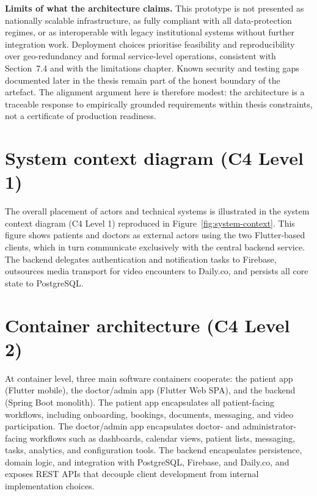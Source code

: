 \documentclass[11pt,a4paper,twoside,openany,headings=normal]{scrreprt}
\begin{document}
\textbf{Limits of what the architecture claims.} This prototype is not presented as nationally scalable infrastructure, as fully compliant with all data-protection regimes, or as interoperable with legacy institutional systems without further integration work. Deployment choices prioritise feasibility and reproducibility over geo-redundancy and formal service-level operations, consistent with Section~7.4 and with the limitations chapter. Known security and testing gaps documented later in the thesis remain part of the honest boundary of the artefact. The alignment argument here is therefore modest: the architecture is a traceable response to empirically grounded requirements within thesis constraints, not a certificate of production readiness.

\section{System context diagram (C4 Level 1)}

The overall placement of actors and technical systems is illustrated in the system context diagram (C4 Level 1) reproduced in Figure~\ref{fig:system-context}. This figure shows patients and doctors as external actors using the two Flutter-based clients, which in turn communicate exclusively with the central backend service. The backend delegates authentication and notification tasks to Firebase, outsources media transport for video encounters to Daily.co, and persists all core state to PostgreSQL.

\ShifaFigSystemContext

\section{Container architecture (C4 Level 2)}

At container level, three main software containers cooperate: the patient app (Flutter mobile), the doctor/admin app (Flutter Web SPA), and the backend (Spring Boot monolith). The patient app encapsulates all patient-facing workflows, including onboarding, bookings, documents, messaging, and video participation. The doctor/admin app encapsulates doctor- and administrator-facing workflows such as dashboards, calendar views, patient lists, messaging, tasks, analytics, and configuration tools. The backend encapsulates persistence, domain logic, and integration with PostgreSQL, Firebase, and Daily.co, and exposes REST APIs that decouple client development from internal implementation choices.
\end{document}
